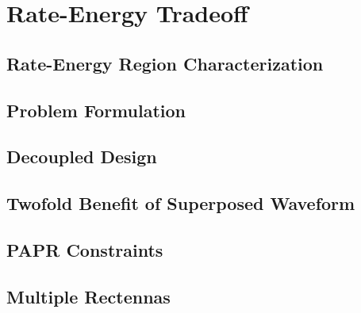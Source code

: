 \chapter{Rate-Energy Tradeoff}



\section{Rate-Energy Region Characterization}\label{sec:rate-energy-region-characterization}
  

\section{Problem Formulation}\label{sec:problem-formulation}
  

\section{Decoupled Design}\label{sec:decoupled-design}
  

\section{Twofold Benefit of Superposed Waveform}\label{sec:twofold-benefit-of-superposed-waveform}
  

\section{PAPR Constraints}\label{sec:papr-constraints}
   
  
\section{Multiple Rectennas}\label{sec:multiple-rectennas}
  